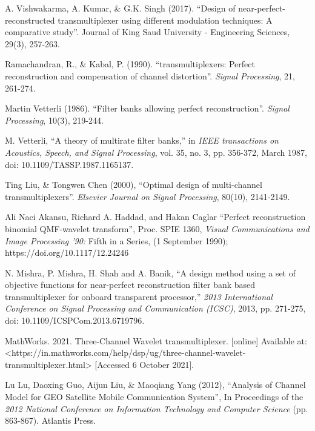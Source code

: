 \documentclass[conference]{IEEEtran}
\begin{document}
\begin{thebibliography}{00}
A. Vishwakarma, A. Kumar, \& G.K. Singh (2017). ``Design of near-perfect-reconstructed transmultiplexer using different modulation techniques: A comparative study''. Journal of King Saud University - Engineering Sciences, 29(3), 257-263.

Ramachandran, R., \& Kabal, P. (1990). ``transmultiplexers: Perfect reconstruction and compensation of channel distortion''. \textit{Signal Processing}, 21, 261-274.

Martin Vetterli (1986). ``Filter banks allowing perfect reconstruction''. \textit{Signal Processing}, 10(3), 219-244.

M. Vetterli, ``A theory of multirate filter banks,'' in \textit{IEEE transactions on Acoustics, Speech, and Signal Processing}, vol. 35, no. 3, pp. 356-372, March 1987, doi: 10.1109/TASSP.1987.1165137.

Ting Liu, \& Tongwen Chen (2000), ``Optimal design of multi-channel transmultiplexers''. \textit{Elsevier Journal on Signal Processing}, 80(10), 2141-2149.

Ali Naci Akansu, Richard A. Haddad, and Hakan Caglar ``Perfect reconstruction binomial QMF-wavelet transform'', Proc. SPIE 1360, \textit{Visual Communications and Image Processing '90:} Fifth in a Series, (1 September 1990); https://doi.org/10.1117/12.24246

N. Mishra, P. Mishra, H. Shah and A. Banik, ``A design method using a set of objective functions for near-perfect reconstruction filter bank based transmultiplexer for onboard transparent processor,'' \textit{2013 International Conference on Signal Processing and Communication (ICSC)}, 2013, pp. 271-275, doi: 10.1109/ICSPCom.2013.6719796.

MathWorks. 2021. Three-Channel Wavelet transmultiplexer. [online] Available at: <https://in.mathworks.com/help/dsp/ug/three-channel-wavelet-transmultiplexer.html> [Accessed 6 October 2021].

 Lu Lu, Daoxing Guo, Aijun Liu, \& Maoqiang Yang (2012), ``Analysis of Channel Model for GEO Satellite Mobile Communication System'', In Proceedings of the \textit{2012 National Conference on Information Technology and Computer Science} (pp. 863-867). Atlantis Press.

\end{thebibliography}
\end{document}
